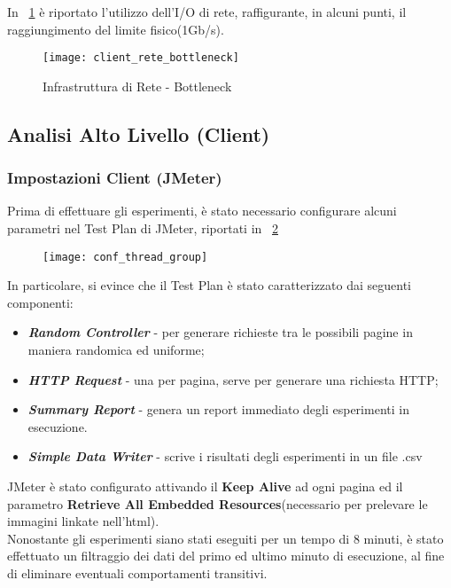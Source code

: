 In \figurename~\ref{bottleneck_rete} è riportato l'utilizzo dell'I/O di rete,
raffigurante, in alcuni punti, il raggiungimento del limite fisico(1Gb/s).\\
\begin{figure}[!htbp]
  \centering
  \texttt{[image: client\_rete\_bottleneck]}
  \caption{Infrastruttura di Rete - Bottleneck}
  \label{bottleneck_rete}
\end{figure}

\clearpage

\subsection{Analisi Alto Livello (Client)}
\subsubsection*{Impostazioni Client (JMeter)}
Prima di effettuare gli esperimenti, è stato necessario configurare alcuni parametri
nel Test Plan di JMeter, riportati in \figurename~\ref{conf_jmeter}

\begin{figure}[!htbp]
  \centering
  \texttt{[image: conf\_thread\_group]}
  \caption{}
  \label{conf_jmeter}
\end{figure}

In particolare, si evince che il Test Plan è stato caratterizzato dai seguenti
componenti:

\begin{itemize}
  \item \textbf{\textit{Random Controller}} - per generare richieste tra le possibili
  pagine in maniera randomica ed uniforme;
  \item \textbf{\textit{HTTP Request}} - una per pagina, serve per generare una
  richiesta HTTP;
  \item \textbf{\textit{Summary Report}} - genera un report immediato degli esperimenti
  in esecuzione.
  \item \textbf{\textit{Simple Data Writer}} - scrive i risultati degli esperimenti
  in un file .csv
\end{itemize}

JMeter è stato configurato attivando il \textbf{Keep Alive} ad ogni pagina
ed il parametro \textbf{Retrieve All Embedded Resources}(necessario per prelevare
le immagini linkate nell'html).\\
Nonostante gli esperimenti siano stati eseguiti per un tempo di 8 minuti, è stato
effettuato un filtraggio dei dati del primo ed ultimo minuto di esecuzione, al fine
di eliminare eventuali comportamenti transitivi.\\


